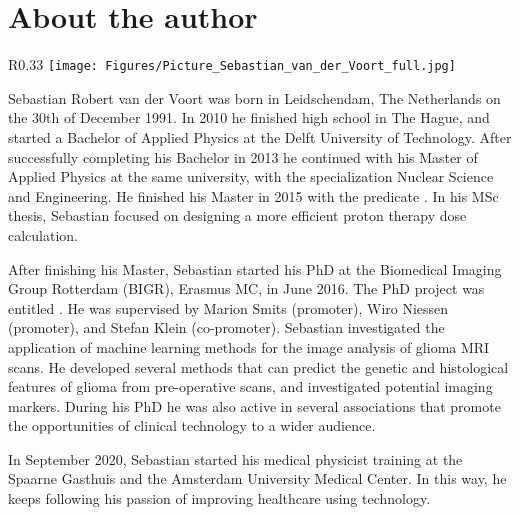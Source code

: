 \chapter{About the author}

\begin{wrapfigure}{R}{0.33\textwidth}
    \centering
    \texttt{[image: Figures/Picture\_Sebastian\_van\_der\_Voort\_full.jpg]}
\end{wrapfigure}


Sebastian Robert van der Voort was born in Leidschendam, The Netherlands on the 30th of December 1991.
In 2010 he finished high school in The Hague, and started a Bachelor of Applied Physics at the Delft University of Technology.
After successfully completing his Bachelor in 2013 he continued with his Master of Applied Physics at the same university, with the specialization Nuclear Science and Engineering.
He finished his Master in 2015 with the predicate .
In his MSc thesis, Sebastian focused on designing a more efficient proton therapy dose calculation.

\vspace{\baselineskip}
\noindent After finishing his Master, Sebastian started his PhD at the Biomedical Imaging Group Rotterdam (BIGR), Erasmus MC, in June 2016.
The PhD project was entitled .
He was supervised by Marion Smits (promoter), Wiro Niessen (promoter), and Stefan Klein (co-promoter).
Sebastian investigated the application of machine learning methods for the image analysis of glioma MRI scans.
He developed several methods that can predict the genetic and histological features of glioma from pre-operative scans, and investigated potential imaging markers.
During his PhD he was also active in several associations that promote the opportunities of clinical technology to a wider audience.

\vspace{\baselineskip}
\noindent In September 2020, Sebastian started his medical physicist training at the Spaarne Gasthuis and the Amsterdam University Medical Center.
In this way, he keeps following his passion of improving healthcare using technology.

